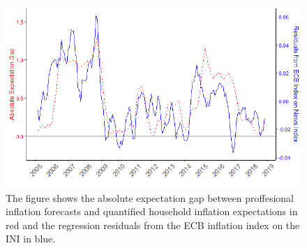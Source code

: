 \documentclass[review]{elsarticle}
\begin{document}
   \begin{figure}[!ht]
    \centering
    \includegraphics{abs_exp_res.png}
\caption{The figure shows the absolute expectation gap between proffesional inflation forecasts and quantified household inflation expectations in red and the regression residuals from the ECB inflation index on the INI in blue.}
    \label{Abs_exp_res}
    \end{figure}
\end{document}
